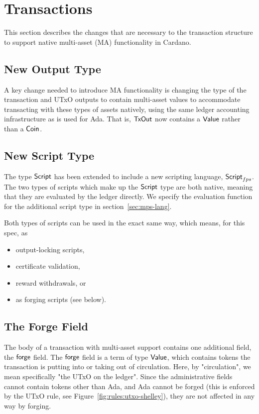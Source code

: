 \section{Transactions}
\label{sec:transactions}

This section describes the changes that are necessary to the
transaction structure to support native multi-asset (MA) functionality in
Cardano.

\subsection*{New Output Type}

A key change needed to introduce MA functionality is changing the type of
the transaction and UTxO outputs to contain multi-asset values to accommodate
transacting with these types of assets natively, using the same ledger accounting
infrastructure as is used for Ada. That is,
$\mathsf{TxOut}$ now contains a $\mathsf{Value}$ rather than a $\mathsf{Coin}$.

\subsection*{New Script Type}

The type $\mathsf{Script}$ has been extended to include a new scripting language,
$\mathsf{Script}_{fps}$. The two types of scripts which make up the $\mathsf{Script}$ type are both
native, meaning
that they are evaluated by the ledger directly. We specify the evaluation
function for the additional script type in section~\ref{sec:mps-lang}.

Both types of scripts can be used in the exact same way, which means, for this
spec, as

\begin{itemize}
  \item output-locking scripts,
  \item certificate validation,
  \item reward withdrawals, or
  \item as forging scripts (see below).
\end{itemize}

\subsection*{The Forge Field}

The body of a transaction with multi-asset support contains one additional
field, the $\mathsf{forge}$ field.
The $\mathsf{forge}$ field is a term of type $\mathsf{Value}$, which contains
tokens the transaction is putting into or taking out of
circulation. Here, by "circulation", we mean specifically "the UTxO on the
ledger". Since the administrative fields cannot contain tokens other than Ada,
and Ada cannot be forged (this is enforced by the UTxO rule, see Figure~\ref{fig:rules:utxo-shelley}),
they are not affected in any way by forging.


